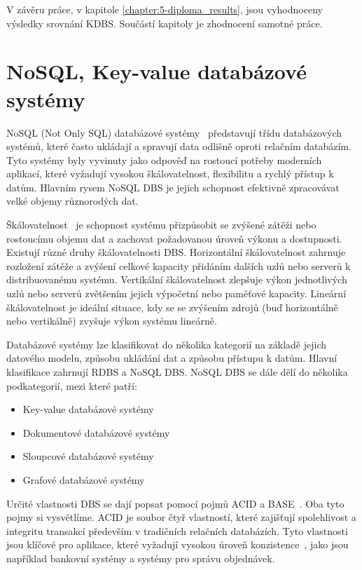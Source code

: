 \documentclass[czech,master,dept460,male,csharp,cpdeclaration]{diploma}
\begin{document}
	V závěru práce, v kapitole \ref{chapter:5-diploma_results}, jsou vyhodnoceny výsledky srovnání KDBS. Součástí kapitoly je zhodnocení samotné práce.
	
	\chapter{NoSQL, Key-value databázové systémy\label{chapter:no-sql-ky-sys}}
	
	NoSQL (Not Only SQL) databázové systémy~\cite{nosql} představují třídu databázových systémů, které často ukládají a spravují data odlišně oproti relačním databázím. Tyto systémy byly vyvinuty jako odpověď na rostoucí potřeby moderních aplikací, které vyžadují vysokou škálovatelnost, flexibilitu a rychlý přístup k datům. Hlavním rysem NoSQL DBS je jejich schopnost efektivně zpracovávat velké objemy různorodých dat.
	
	Škálovatelnost~\cite{scalability}\label{scaling-dbs} je schopnost systému přizpůsobit se zvýšené zátěži nebo rostoucímu objemu dat a zachovat požadovanou úroveň výkonu a dostupnosti. Existují různé druhy škálovatelnosti DBS. Horizontální škálovatelnost zahrnuje rozložení zátěže a zvýšení celkové kapacity přidáním dalších uzlů nebo serverů k distribuovanému systému. Vertikální škálovatelnost zlepšuje výkon jednotlivých uzlů nebo serverů zvětšením jejich výpočetní nebo paměťové kapacity. Lineární škálovatelnost je ideální situace, kdy se se zvýšením zdrojů (buď horizontálně nebo vertikálně) zvyšuje výkon systému lineárně.
	
	Databázové systémy lze klasifikovat do několika kategorií na základě jejich datového modelu, způsobu ukládání dat a způsobu přístupu k datům. Hlavní klasifikace zahrnují RDBS a NoSQL DBS. NoSQL DBS se dále dělí do několika podkategorií, mezi které patří:
	
	\begin{itemize}
		\item Key-value databázové systémy
		\item Dokumentové databázové systémy
		\item Sloupcové databázové systémy
		\item Grafové databázové systémy
	\end{itemize}
	
	Určité vlastnosti DBS se dají popsat pomocí pojmů ACID a BASE~\cite{acid-vs-base}. Oba tyto pojmy si vysvětlíme. ACID je soubor čtyř vlastností, které zajišťují spolehlivost a integritu transakcí především v tradičních relačních databázích. Tyto vlastnosti jsou klíčové pro aplikace, které vyžadují vysokou úroveň konzistence~\cite{integrita}, jako jsou například bankovní systémy a systémy pro správu objednávek.
	
\end{document}
